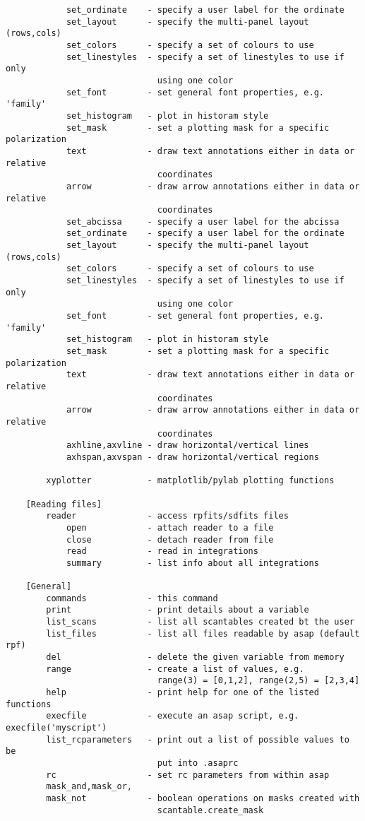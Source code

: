 \documentclass[11pt]{article}
\begin{document}
\begin{verbatim}
            set_ordinate    - specify a user label for the ordinate
            set_layout      - specify the multi-panel layout (rows,cols)
            set_colors      - specify a set of colours to use
            set_linestyles  - specify a set of linestyles to use if only
                              using one color
            set_font        - set general font properties, e.g. 'family'
            set_histogram   - plot in historam style
            set_mask        - set a plotting mask for a specific polarization
            text            - draw text annotations either in data or relative
                              coordinates
            arrow           - draw arrow annotations either in data or relative
                              coordinates
            set_abcissa     - specify a user label for the abcissa
            set_ordinate    - specify a user label for the ordinate
            set_layout      - specify the multi-panel layout (rows,cols)
            set_colors      - specify a set of colours to use
            set_linestyles  - specify a set of linestyles to use if only
                              using one color
            set_font        - set general font properties, e.g. 'family'
            set_histogram   - plot in historam style
            set_mask        - set a plotting mask for a specific polarization
            text            - draw text annotations either in data or relative
                              coordinates
            arrow           - draw arrow annotations either in data or relative
                              coordinates
            axhline,axvline - draw horizontal/vertical lines
            axhspan,axvspan - draw horizontal/vertical regions

        xyplotter           - matplotlib/pylab plotting functions

    [Reading files]
        reader              - access rpfits/sdfits files
            open            - attach reader to a file
            close           - detach reader from file
            read            - read in integrations
            summary         - list info about all integrations

    [General]
        commands            - this command
        print               - print details about a variable
        list_scans          - list all scantables created bt the user
        list_files          - list all files readable by asap (default rpf)
        del                 - delete the given variable from memory
        range               - create a list of values, e.g.
                              range(3) = [0,1,2], range(2,5) = [2,3,4]
        help                - print help for one of the listed functions
        execfile            - execute an asap script, e.g. execfile('myscript')
        list_rcparameters   - print out a list of possible values to be
                              put into .asaprc
        rc                  - set rc parameters from within asap
        mask_and,mask_or,
        mask_not            - boolean operations on masks created with
                              scantable.create_mask
\end{verbatim}
\end{document}
